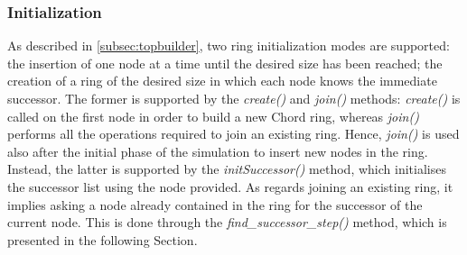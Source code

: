 \documentclass[11pt,twocolumn,letterpaper]{article}
\begin{document}
	\subsubsection{Initialization}
	\label{subsubsec:init}
	As described in \cref{subsec:topbuilder}, two ring initialization modes are supported: the insertion of one node at a time until the desired size has been reached; the creation of a ring of the desired size in which each node knows the immediate successor. \newline
	The former is supported by the \textit{create()} and \textit{join()} methods: \textit{create()} is called on the first node in order to build a new Chord ring, whereas \textit{join()} performs all the operations required to join an existing ring. Hence, \textit{join()} is used also after the initial phase of the simulation to insert new nodes in the ring. \newline
	Instead, the latter is supported by the \textit{initSuccessor()} method, which initialises the successor list using the node provided. \newline
	As regards joining an existing ring, it implies asking a node already contained in the ring for the successor of the current node. This is done through the \textit{find\_successor\_step()} method, which is presented in the following Section.
	
\end{document}
